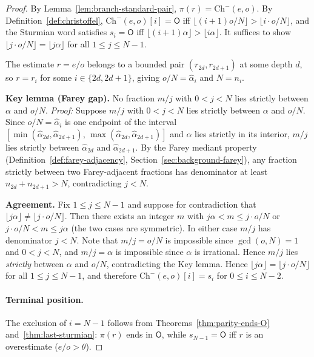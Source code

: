 \documentclass[12pt]{article}
\theoremstyle{definition}
\theoremstyle{remark}
\theoremstyle{plain}
\newcommand{\OO}{\mathsf{O}}
\begin{document}
\begin{proof}
By Lemma~\ref{lem:branch-standard-pair}, $\pi(r) = \mathrm{Ch}^-(e, o)$.
By Definition~\ref{def:christoffel}, $\mathrm{Ch}^-(e,o)[i] = \OO$ iff
$\lfloor(i+1)o/N\rfloor > \lfloor i \cdot o/N\rfloor$, and the Sturmian word
satisfies $s_i = \OO$ iff $\lfloor(i+1)\alpha\rfloor > \lfloor i\alpha\rfloor$.
It suffices to show $\lfloor j \cdot o/N \rfloor = \lfloor j\alpha \rfloor$ for
all $1 \leq j \leq N-1$.

The estimate $r = e/o$ belongs to a bounded pair $(r_{2d}, r_{2d+1})$ at some depth $d$,
so $r = r_i$ for some $i \in \{2d, 2d+1\}$, giving $o/N = \hat{\alpha}_i$ and $N = n_i$.

\textbf{Key lemma (Farey gap).}
No fraction $m/j$ with $0 < j < N$ lies strictly between $\alpha$ and $o/N$.
\emph{Proof:} Suppose $m/j$ with $0 < j < N$ lies strictly between $\alpha$ and $o/N$.
Since $o/N = \hat{\alpha}_i$ is one endpoint of the interval
$[\min(\hat{\alpha}_{2d}, \hat{\alpha}_{2d+1}),\, \max(\hat{\alpha}_{2d}, \hat{\alpha}_{2d+1})]$
and $\alpha$ lies strictly in its interior, $m/j$ lies strictly between
$\hat{\alpha}_{2d}$ and $\hat{\alpha}_{2d+1}$.
By the Farey mediant property (Definition~\ref{def:farey-adjacency},
Section~\ref{sec:background-farey}), any fraction strictly between two Farey-adjacent
fractions has denominator at least $n_{2d} + n_{2d+1} > N$, contradicting $j < N$.

\textbf{Agreement.}
Fix $1 \leq j \leq N-1$ and suppose for contradiction that
$\lfloor j\alpha \rfloor \neq \lfloor j \cdot o/N \rfloor$.
Then there exists an integer $m$ with $j\alpha < m \leq j \cdot o/N$ or
$j \cdot o/N < m \leq j\alpha$ (the two cases are symmetric).
In either case $m/j$ has denominator $j < N$.
Note that $m/j = o/N$ is impossible since $\gcd(o, N) = 1$ and $0 < j < N$,
and $m/j = \alpha$ is impossible since $\alpha$ is irrational.
Hence $m/j$ lies \emph{strictly} between $\alpha$ and $o/N$,
contradicting the Key lemma.
Hence $\lfloor j\alpha \rfloor = \lfloor j \cdot o/N \rfloor$ for all $1 \leq j \leq N-1$,
and therefore $\mathrm{Ch}^-(e,o)[i] = s_i$ for $0 \leq i \leq N-2$.

\paragraph{Terminal position.}
The exclusion of $i = N-1$ follows from Theorems~\ref{thm:parity-ends-O}
and~\ref{thm:last-sturmian}: $\pi(r)$ ends in $\OO$, while $s_{N-1} = \OO$ iff
$r$ is an overestimate ($e/o > \theta$).
\end{proof}
\end{document}
